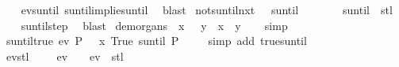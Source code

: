 \begin{isabellebody}
%
\isadelimproof
\ \ %
\endisadelimproof
%
\isatagproof
{}\isamarkupfalse%
\ ev{\isacharunderscore}suntil\ suntil{\isacharunderscore}implies{\isacharunderscore}until\ \isamarkupfalse%
\ blast%
\endisatagproof
{\isafoldproof}%
%
\isadelimproof
\isanewline
%
\endisadelimproof
\isanewline
{}\isamarkupfalse%
\ not{\isacharunderscore}suntil{\isacharunderscore}nxt{\isacharcolon}\ {\isachardoublequoteopen}\ {\isasymnot}{\isacharparenleft}{\isasymphi}\ suntil\ {\isasympsi}{\isacharparenright}\ {\isasymomega}\ {\isasymLongrightarrow}\ {\isasymphi}\ {\isasymomega}\ {\isasymLongrightarrow}\ {\isasymnot}{\isacharparenleft}{\isasymphi}\ suntil\ {\isasympsi}{\isacharparenright}\ {\isacharparenleft}stl\ {\isasymomega}{\isacharparenright}{\isachardoublequoteclose}\isanewline
%
\isadelimproof
\ \ %
\endisadelimproof
%
\isatagproof
{}\isamarkupfalse%
\ suntil{\isachardot}step\ \isamarkupfalse%
\ blast%
\endisatagproof
{\isafoldproof}%
%
\isadelimproof
\isanewline
%
\endisadelimproof
\isanewline
{}\isamarkupfalse%
\ de{\isacharunderscore}morgans{\isacharcolon}\ {\isachardoublequoteopen}{\isacharparenleft}{\isasymnot}\ x\ {\isasymor}\ {\isasymnot}\ y{\isacharparenright}\ {\isacharequal}\ {\isacharparenleft}{\isasymnot}{\isacharparenleft}x\ {\isasymand}\ y{\isacharparenright}{\isacharparenright}{\isachardoublequoteclose}\isanewline
%
\isadelimproof
\ \ %
\endisadelimproof
%
\isatagproof
{}\isamarkupfalse%
\ simp%
\endisatagproof
{\isafoldproof}%
%
\isadelimproof
\isanewline
%
\endisadelimproof
\isanewline
{}\isamarkupfalse%
\ suntil{\isacharunderscore}true{\isacharcolon}\ {\isachardoublequoteopen}ev\ P\ {\isasymomega}\ {\isacharequal}\ {\isacharparenleft}{\isacharparenleft}{\isasymlambda}x{\isachardot}\ True{\isacharparenright}\ suntil\ P{\isacharparenright}\ {\isasymomega}{\isachardoublequoteclose}\isanewline
%
\isadelimproof
\ \ %
\endisadelimproof
%
\isatagproof
{}\isamarkupfalse%
\ {\isacharparenleft}simp\ add{\isacharcolon}\ true{\isacharunderscore}suntil{\isacharparenright}%
\endisatagproof
{\isafoldproof}%
%
\isadelimproof
\isanewline
%
\endisadelimproof
\isanewline
{}\isamarkupfalse%
\ ev{\isacharunderscore}stl{\isacharcolon}\ {\isachardoublequoteopen}{\isasymnot}\ {\isasympsi}\ {\isasymomega}\ {\isasymLongrightarrow}\ ev\ {\isasympsi}\ {\isasymomega}\ {\isacharequal}\ ev\ {\isasympsi}\ {\isacharparenleft}stl\ {\isasymomega}{\isacharparenright}{\isachardoublequoteclose}\isanewline
%
\isadelimproof
\ \ %
\endisadelimproof

\end{isabellebody}

